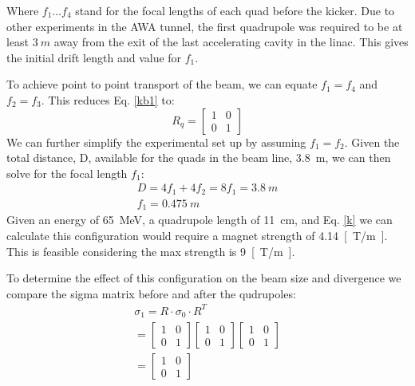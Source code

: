 Where $f_1 \ldots f_4$ stand for the focal lengths of each quad before the kicker. 
Due to other experiments in the AWA tunnel, 
the first quadrupole was required to be at least $\SI{3}{m}$ away from the exit of the 
last accelerating cavity in the linac. This gives the initial drift length and value
for $f_1$. 

To achieve point to point transport of the beam, we can 
equate $f_1 = f_4$ and $f_2 = f_3$. This reduces Eq. \ref{kb1} to:
 \begin{equation}
R_q =
\begin{bmatrix}
1 & 0 \\
0 & 1	
\end{bmatrix}
\end{equation}
We can further simplify the experimental set up by 
assuming $f_1=f_2$. Given the total distance, D, available for the
quads in the beam line, \SI{3.8}{m}, we can then solve
for the focal length $f_1$: 
\begin{align}
	D = 4f_1 + 4 f_2 = 8f_1 = \SI{3.8}{m} \\
	f_1 = \SI{0.475}{m}
\end{align}
Given an energy of \SI{65}{MeV}, a quadrupole length of \SI{11}{cm}, 
and Eq. \ref{k} we can calculate this configuration would require a 
magnet strength of \SI{4.14}{[T/m]}. This is feasible considering the 
max strength is \SI{9}{[T/m]}.

To determine the effect of this configuration on the beam size and divergence
we compare the sigma matrix before and after the qudrupoles:
\begin{align}
	\sigma_1 = R\cdot \sigma_0 \cdot R^T \\
	= 
	\begin{bmatrix}
	1 & 0 \\
	0 & 1	
	\end{bmatrix}
	\begin{bmatrix}
	1 & 0 \\
	0 & 1	
	\end{bmatrix}
    \begin{bmatrix}
	1 & 0 \\
	0 & 1	
	\end{bmatrix} \\
	=
	\begin{bmatrix}
	1 & 0 \\
	0 & 1	
	\end{bmatrix}
\end{align}

